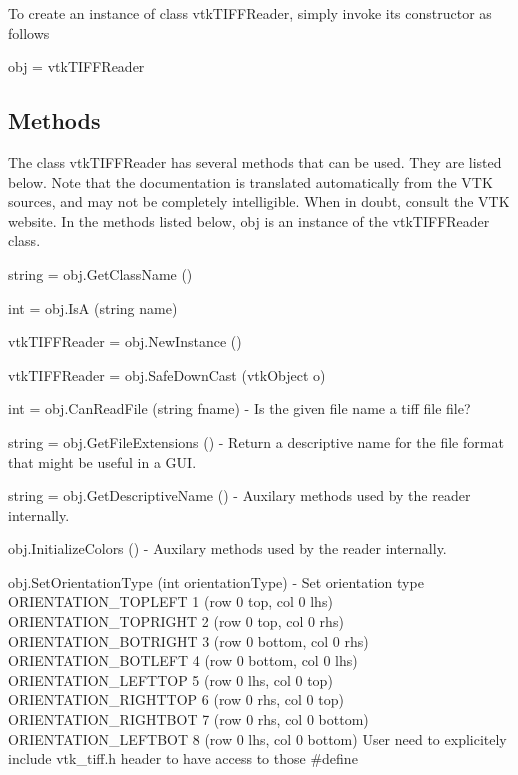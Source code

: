 To create an instance of class vtk\-T\-I\-F\-F\-Reader, simply invoke its constructor as follows \begin{DoxyVerb}  obj = vtkTIFFReader
\end{DoxyVerb}
 \hypertarget{vtkwidgets_vtkxyplotwidget_Methods}{}\subsection{Methods}\label{vtkwidgets_vtkxyplotwidget_Methods}
The class vtk\-T\-I\-F\-F\-Reader has several methods that can be used. They are listed below. Note that the documentation is translated automatically from the V\-T\-K sources, and may not be completely intelligible. When in doubt, consult the V\-T\-K website. In the methods listed below, {\ttfamily obj} is an instance of the vtk\-T\-I\-F\-F\-Reader class. 
\begin{DoxyItemize}
\item {\ttfamily string = obj.\-Get\-Class\-Name ()}  
\item {\ttfamily int = obj.\-Is\-A (string name)}  
\item {\ttfamily vtk\-T\-I\-F\-F\-Reader = obj.\-New\-Instance ()}  
\item {\ttfamily vtk\-T\-I\-F\-F\-Reader = obj.\-Safe\-Down\-Cast (vtk\-Object o)}  
\item {\ttfamily int = obj.\-Can\-Read\-File (string fname)} -\/ Is the given file name a tiff file file?  
\item {\ttfamily string = obj.\-Get\-File\-Extensions ()} -\/ Return a descriptive name for the file format that might be useful in a G\-U\-I.  
\item {\ttfamily string = obj.\-Get\-Descriptive\-Name ()} -\/ Auxilary methods used by the reader internally.  
\item {\ttfamily obj.\-Initialize\-Colors ()} -\/ Auxilary methods used by the reader internally.  
\item {\ttfamily obj.\-Set\-Orientation\-Type (int orientation\-Type)} -\/ Set orientation type O\-R\-I\-E\-N\-T\-A\-T\-I\-O\-N\-\_\-\-T\-O\-P\-L\-E\-F\-T 1 (row 0 top, col 0 lhs) O\-R\-I\-E\-N\-T\-A\-T\-I\-O\-N\-\_\-\-T\-O\-P\-R\-I\-G\-H\-T 2 (row 0 top, col 0 rhs) O\-R\-I\-E\-N\-T\-A\-T\-I\-O\-N\-\_\-\-B\-O\-T\-R\-I\-G\-H\-T 3 (row 0 bottom, col 0 rhs) O\-R\-I\-E\-N\-T\-A\-T\-I\-O\-N\-\_\-\-B\-O\-T\-L\-E\-F\-T 4 (row 0 bottom, col 0 lhs) O\-R\-I\-E\-N\-T\-A\-T\-I\-O\-N\-\_\-\-L\-E\-F\-T\-T\-O\-P 5 (row 0 lhs, col 0 top) O\-R\-I\-E\-N\-T\-A\-T\-I\-O\-N\-\_\-\-R\-I\-G\-H\-T\-T\-O\-P 6 (row 0 rhs, col 0 top) O\-R\-I\-E\-N\-T\-A\-T\-I\-O\-N\-\_\-\-R\-I\-G\-H\-T\-B\-O\-T 7 (row 0 rhs, col 0 bottom) O\-R\-I\-E\-N\-T\-A\-T\-I\-O\-N\-\_\-\-L\-E\-F\-T\-B\-O\-T 8 (row 0 lhs, col 0 bottom) User need to explicitely include vtk\-\_\-tiff.\-h header to have access to those \#define  

\end{DoxyItemize}

